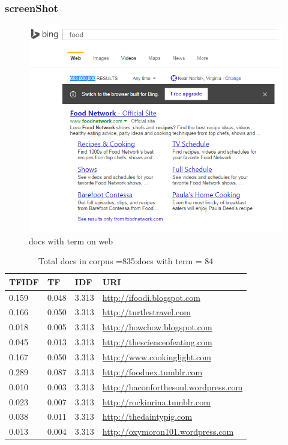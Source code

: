\documentclass[12pt]{article}
\begin{document}
\subsubsection{screenShot}
\begin{figure}[ht]
\includegraphics[scale=0.7]{../Q2/screenShot}
\centering
\caption{docs with term on web }
\end{figure}
\newpage


\begin{center}
\begin{table}
\small
\begin{tabular}{ | p{3.0cm} | p{3.0cm} |p{3.0cm} | p{8.0cm} | }\hline
\textbf{TFIDF} & \textbf{TF} & \textbf{IDF} & \textbf{URI} \\\hline
0.159 & 0.048 & 3.313 & \url{http://ifoodi.blogspot.com } \\\hline
0.166 & 0.050 & 3.313 & \url{ http://turtlestravel.com} \\\hline
0.018 & 0.005 & 3.313 & \url{ http://howchow.blogspot.com} \\\hline
0.045 & 0.013 & 3.313 & \url{ http://thescienceofeating.com} \\\hline 
0.167 & 0.050 & 3.313 & \url{ http://www.cookinglight.com} \\\hline
0.289 & 0.087 & 3.313 & \url{http://foodnex.tumblr.com} \\\hline
0.010 & 0.003 & 3.313 & \url{ http://baconforthesoul.wordpress.com} \\\hline
0.023 & 0.007 & 3.313 & \url{ http://rockinrina.tumblr.com} \\\hline
0.038 & 0.011 & 3.313 & \url{ http://thedaintypig.com} \\\hline
0.013 & 0.004 & 3.313 & \url{ http://oxymoron101.wordpress.com} \\\hline
\end{tabular}
\caption{Total docs in corpus =835:docs with term = 84}
\end{table}
\end{center}
\end{document}
